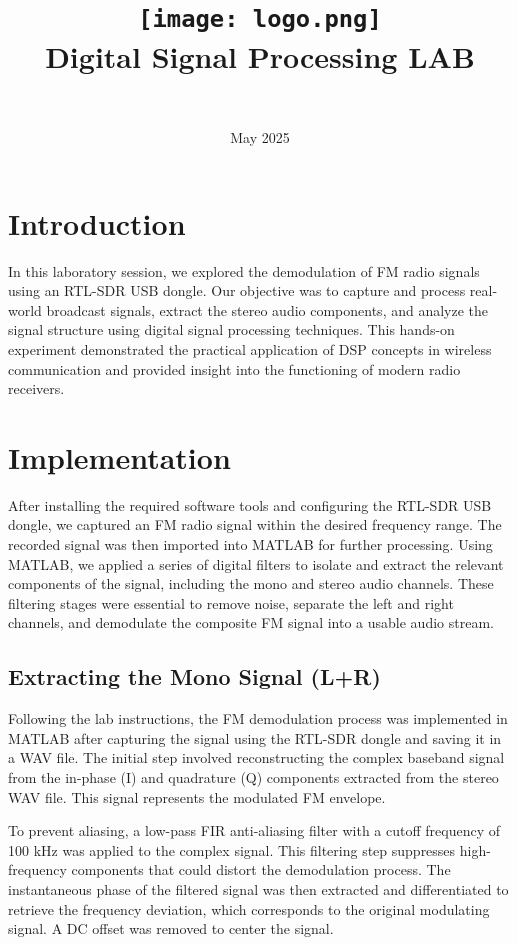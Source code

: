\documentclass{article}
\title{
    \texttt{[image: logo.png]} \\ 
    Digital Signal Processing LAB \\ \exerciseset
}
\author{\FirstAuthor \\ \SecondAuthor}
\date{May 2025}
\begin{document}
\maketitle

\section*{Introduction}
In this laboratory session, we explored the demodulation of FM radio signals using an RTL-SDR USB dongle. Our objective was to capture and process real-world broadcast signals, extract the stereo audio components, and analyze the signal structure using digital signal processing techniques. This hands-on experiment demonstrated the practical application of DSP concepts in wireless communication and provided insight into the functioning of modern radio receivers.
\section*{Implementation}
After installing the required software tools and configuring the RTL-SDR USB dongle, we captured an FM radio signal within the desired frequency range. The recorded signal was then imported into MATLAB for further processing. Using MATLAB, we applied a series of digital filters to isolate and extract the relevant components of the signal, including the mono and stereo audio channels. These filtering stages were essential to remove noise, separate the left and right channels, and demodulate the composite FM signal into a usable audio stream.



\subsection*{Extracting the Mono Signal (L+R)}
Following the lab instructions, the FM demodulation process was implemented in MATLAB after capturing the signal using the RTL-SDR dongle and saving it in a WAV file. The initial step involved reconstructing the complex baseband signal from the in-phase (I) and quadrature (Q) components extracted from the stereo WAV file. This signal represents the modulated FM envelope.

To prevent aliasing, a low-pass FIR anti-aliasing filter with a cutoff frequency of 100 kHz was applied to the complex signal. This filtering step suppresses high-frequency components that could distort the demodulation process. The instantaneous phase of the filtered signal was then extracted and differentiated to retrieve the frequency deviation, which corresponds to the original modulating signal. A DC offset was removed to center the signal.
\end{document}
